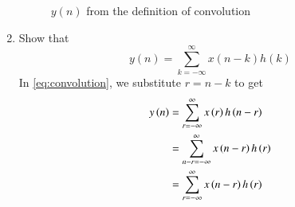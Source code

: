 \documentclass[journal,12pt,twocolumn]{IEEEtran}
\theoremstyle{remark}
\begin{document}
\begin{enumerate}[label=\thesection.\arabic*]
\begin{figure}[!ht]
\caption{$y(n)$ from the definition of convolution}
\label{fig:ynconv}
\end{figure}

\item Show that
\begin{equation}
y(n) =  \sum_{k=-\infty}^{\infty}x(n-k)h(k)
\end{equation}
\solution
In \eqref{eq:convolution}, we substitute $r = n - k$ to get
\begin{align}
y\left(n\right) &= \sum_{r=-\infty}^{\infty}x\left(r\right)h\left(n - r\right) \\
		  &= \sum_{n - r=-\infty}^{\infty}x\left(n - r\right)h\left(r\right) \\
		  &= \sum_{r=-\infty}^{\infty}x\left(n - r\right)h\left(r\right)
\end{align}

\end{enumerate}

%
\end{document}
